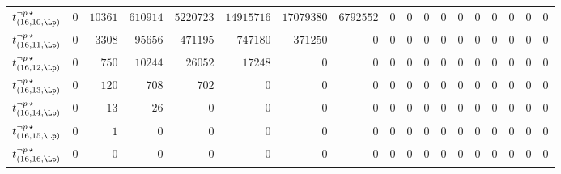 \begin{tabular}{r|rrrrrrrrrrrrrrrrr}
  $t^{\neg p \, \star}_{(16,10,\Lp)}$ & $0$ & $10361$ & $610914$ & $5220723$ & $14915716$ & $17079380$ & $6792552$ & $0$ & $0$ & $0$ & $0$ & $0$ & $0$ & $0$ & $0$ & $0$ & $0$ \\
  $t^{\neg p \, \star}_{(16,11,\Lp)}$ & $0$ & $3308$ & $95656$ & $471195$ & $747180$ & $371250$ & $0$ & $0$ & $0$ & $0$ & $0$ & $0$ & $0$ & $0$ & $0$ & $0$ & $0$ \\
  $t^{\neg p \, \star}_{(16,12,\Lp)}$ & $0$ & $750$ & $10244$ & $26052$ & $17248$ & $0$ & $0$ & $0$ & $0$ & $0$ & $0$ & $0$ & $0$ & $0$ & $0$ & $0$ & $0$ \\
  $t^{\neg p \, \star}_{(16,13,\Lp)}$ & $0$ & $120$ & $708$ & $702$ & $0$ & $0$ & $0$ & $0$ & $0$ & $0$ & $0$ & $0$ & $0$ & $0$ & $0$ & $0$ & $0$ \\
  $t^{\neg p \, \star}_{(16,14,\Lp)}$ & $0$ & $13$ & $26$ & $0$ & $0$ & $0$ & $0$ & $0$ & $0$ & $0$ & $0$ & $0$ & $0$ & $0$ & $0$ & $0$ & $0$ \\
  $t^{\neg p \, \star}_{(16,15,\Lp)}$ & $0$ & $1$ & $0$ & $0$ & $0$ & $0$ & $0$ & $0$ & $0$ & $0$ & $0$ & $0$ & $0$ & $0$ & $0$ & $0$ & $0$ \\
  $t^{\neg p \, \star}_{(16,16,\Lp)}$ & $0$ & $0$ & $0$ & $0$ & $0$ & $0$ & $0$ & $0$ & $0$ & $0$ & $0$ & $0$ & $0$ & $0$ & $0$ & $0$ & $0$ \\
\end{tabular}
